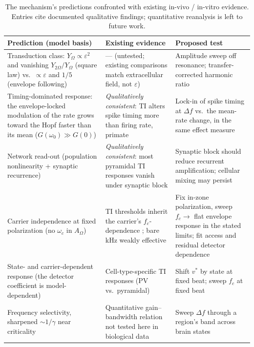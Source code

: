 \documentclass[11pt,a4paper]{article}
\begin{document}
\begin{table}[h]
\centering\small
\renewcommand{\arraystretch}{1.25}
\begin{tabular}{@{}>{\raggedright\arraybackslash}p{} >{\raggedright\arraybackslash}p{} >{\raggedright\arraybackslash}p{}@{}}
\toprule
\textbf{Prediction (model basis)} & \textbf{Existing evidence} & \textbf{Proposed test} \\
\midrule
Transduction class: $Y_\Omega\propto\varepsilon^2$ and vanishing $Y_{2\Omega}/Y_\Omega$
(square law) vs.\ $\propto\varepsilon$ and $1/5$ (envelope following) & --- (untested;
existing comparisons match extracellular field, not $\varepsilon$) & Amplitude sweep off
resonance; transfer-corrected harmonic ratio \\
Timing-dominated response: the envelope-locked modulation of the rate grows toward
the Hopf faster than its mean ($G(\omega_0)\!\gg\!G(0)$) & \emph{Qualitatively
consistent}: TI alters spike timing more than firing rate, primate \cite{vieira2024} &
Lock-in of spike timing at $\Delta f$ vs.\ the mean-rate change, in the same effect
measure \\
Network read-out (population nonlinearity + synaptic recurrence) &
\emph{Qualitatively consistent}: most pyramidal TI responses vanish under synaptic block
\cite{caldas2024} & Synaptic block should reduce recurrent amplification; cellular
mixing may persist \\
Carrier independence at fixed polarization (no $\omega_c$ in $A_\Omega$) & TI thresholds
inherit the carrier's $f_c$-dependence \cite{opancar2025,peripheral2023}; bare kHz weakly
effective \cite{esmaeilpour2020} & Fix in-zone polarization, sweep $f_c\!\to$ flat envelope
response in the stated limits; fit access and residual detector dependence \\
State- and carrier-dependent response (the detector coefficient is model-dependent) &
Cell-type-specific TI responses (PV vs.\ pyramidal) \cite{caldas2024} & Shift $v^*$ by
state at fixed beat; sweep $f_c$ at fixed beat \\
Frequency selectivity, sharpened $\sim1/\gamma$ near criticality & Quantitative
gain--bandwidth relation not tested here in biological data & Sweep $\Delta f$ through a region's band across brain
states \\
\bottomrule
\end{tabular}
\caption{The mechanism's predictions confronted with existing in-vivo / in-vitro evidence.
Entries cite documented qualitative findings; quantitative reanalysis is left to future
work.}\label{tab:predictions}
\end{table}
\end{document}
